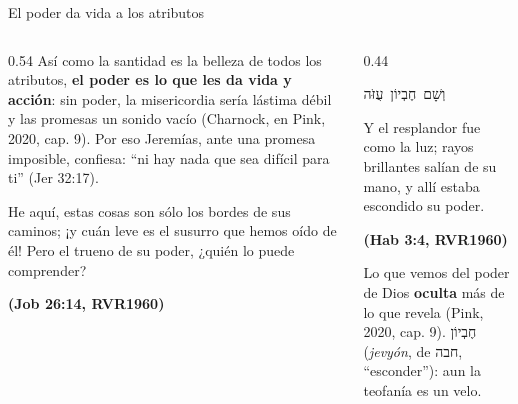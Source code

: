 \documentclass[hyperref={bookmarks=false},aspectratio=169]{beamer}
\newcommand{\heb}[1]{\mbox{\foreignlanguage{hebrew}{#1}}}
\newcommand{\fuente}[1]{\par\hfill{\upshape\bfseries\footnotesize\textcolor{azul}{#1}}}
\newcommand{\destacar}[1]{\textbf{\textcolor{azul}{#1}}}
\begin{document}
\begin{frame}{El poder da vida a los atributos}
\begin{columns}[t,onlytextwidth]
\begin{column}{0.54\textwidth}\small
Así como la santidad es la belleza de todos los atributos, \destacar{el poder es lo que les da vida y acción}: sin poder, la misericordia sería lástima débil y las promesas un sonido vacío (Charnock, en Pink, 2020, cap. 9). Por eso Jeremías, ante una promesa imposible, confiesa: ``ni hay nada que sea difícil para ti'' (Jer 32:17).\par\medskip
\begin{cita}He aquí, estas cosas son sólo los bordes de sus caminos; ¡y cuán leve es el susurro que hemos oído de él! Pero el trueno de su poder, ¿quién lo puede comprender?\fuente{(Job 26:14, RVR1960)}\end{cita}
\end{column}
\begin{column}{0.44\textwidth}
\begin{center}\small\heb{וְשָׁם חֶבְיוֹן עֻזֹּה}\end{center}
\begin{cita}Y el resplandor fue como la luz; rayos brillantes salían de su mano, y allí estaba escondido su poder.\fuente{(Hab 3:4, RVR1960)}\end{cita}
\scriptsize Lo que vemos del poder de Dios \destacar{oculta} más de lo que revela (Pink, 2020, cap. 9). \heb{חֶבְיוֹן} (\emph{jevyón}, de \heb{חבה}, ``esconder''): aun la teofanía es un velo.
\end{column}
\end{columns}
\end{frame}
\end{document}
